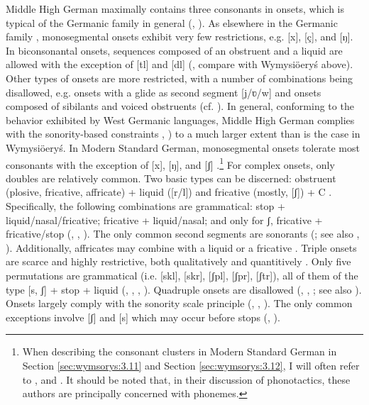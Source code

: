 \documentclass[output=paper,hidelinks]{langscibook}
\begin{document}
Middle High German maximally contains three consonants in onsets, which is typical of the Germanic family in general (\citealt[66]{harbert_germanic_2007}, \citealt[34]{van_oostendorp_germanic_2019}). As elsewhere in the Germanic family \citep[35]{van_oostendorp_germanic_2019}, monosegmental onsets exhibit very few restrictions, e.g. [x], [ç], and [ŋ]. In biconsonantal onsets, sequences composed of an obstruent and a liquid are allowed with the exception of [tl] and [dl] (\citealt[36]{van_oostendorp_germanic_2019}, compare with Wymysiöeryś above). Other types of onsets are more restricted, with a number of combinations being disallowed, e.g. onsets with a glide as second segment [j/ʋ/w] and onsets composed of sibilants and voiced obstruents (cf. \citealt[36--38]{van_oostendorp_germanic_2019}). In general, conforming to the behavior exhibited by West Germanic languages, Middle High German complies with the sonority-based constraints \citep[68, 73]{harbert_germanic_2007}, \citealt[36]{van_oostendorp_germanic_2019}) to a much larger extent than is the case in Wymysiöeryś. In Modern Standard German, monosegmental onsets tolerate most consonants with the exception of [x], [ŋ], and [ʃ] \citep[58]{fox_structure_2005}.\footnote{When describing the consonant clusters in Modern Standard German in Section \ref{sec:wymsorys:3.11} and Section \ref{sec:wymsorys:3.12}, I will often refer to \citet{russ_german_1994, wiese_phonology_1996, hall_phonologie_2000, fox_structure_2005}, and \citet{obrein_german_2016}. It should be noted that, in their discussion of phonotactics, these authors are principally concerned with phonemes.} For complex onsets, only doubles are relatively common. Two basic types can be discerned: obstruent (plosive, fricative, affricate) + liquid ([r/l]) and fricative (mostly, [ʃ]) + C \citep[58]{fox_structure_2005}. Specifically, the following combinations are grammatical: stop + liquid/nasal/fricative; fricative + liquid/nasal; and only for ʃ, fricative + fricative/stop (\citealt[133]{veith_phonetik_1980}, \citealt[356]{eisenberg_german_1994}, \citealt[120]{russ_german_1994}). The only common second segments are sonorants (\citealt[35]{fagan_german_2009}; see also \citealt[66]{obrein_german_2016}, \citealt[231]{hall_phonologie_2000}). Additionally, affricates may combine with a liquid or a fricative \citep[35, 58]{fagan_german_2009}. Triple onsets are scarce and highly restrictive, both qualitatively and quantitively \citep[50]{kucera_comparative_1968}. Only five permutations are grammatical (i.e. [skl], [skr], [ʃpl], [ʃpr], [ʃtr]), all of them of the type [s, ʃ] + stop + liquid (\citealt[58]{fox_structure_2005}, \citealt[36]{fagan_german_2009}, \citealt[69]{hall_syllable_1992}, \citeyear{hall_phonologie_2000}). Quadruple onsets are disallowed (\citealt[50]{kucera_comparative_1968}, \citealt[355]{eisenberg_german_1994}, \citealt[55]{fox_structure_2005}; see also \citealt{wiese_phonology_1996}). Onsets largely comply with the sonority scale principle (\citealt[260]{wiese_phonology_1996}, \citealt[60]{fox_structure_2005}, \citealt[36--37]{van_oostendorp_germanic_2019}). The only common exceptions involve [ʃ] and [s] which may occur before stops (\citealt[60]{fox_structure_2005}, \citealt[39--40]{van_oostendorp_germanic_2019}).
\end{document}
